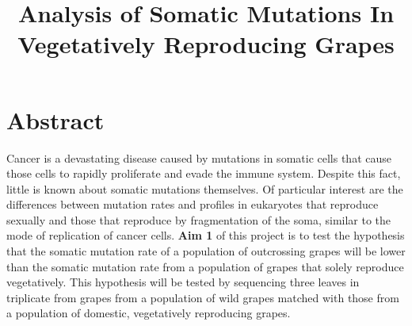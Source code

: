 \documentclass[12pt]{article}
\title{Analysis of Somatic Mutations In Vegetatively Reproducing Grapes}
\date{}
\begin{document}
\maketitle





\section{Abstract}
Cancer is a devastating disease caused by mutations in somatic cells that cause those cells to rapidly proliferate and evade the immune system. Despite this fact, little is known about somatic mutations themselves. Of particular interest are the differences between mutation rates and profiles in eukaryotes that reproduce sexually and those that reproduce by fragmentation of the soma, similar to the mode of replication of cancer cells.
\textbf{Aim 1} of this project is to test the hypothesis that the somatic mutation rate of a population of outcrossing grapes will be lower than the somatic mutation rate from a population of grapes that solely reproduce vegetatively. This hypothesis will be tested by sequencing three leaves in triplicate from grapes from a population of wild grapes matched with those from a population of domestic, vegetatively reproducing grapes. 
\end{document}
